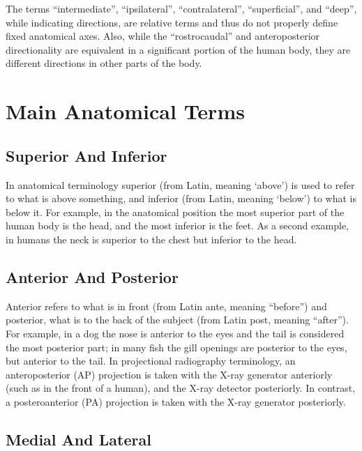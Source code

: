 The terms ``intermediate'', ``ipsilateral'', ``contralateral'', ``superficial'', and ``deep'', while indicating directions, are relative terms and thus do not properly define fixed anatomical axes. Also, while the ``rostrocaudal'' and anteroposterior directionality are equivalent in a significant portion of the human body, they are different directions in other parts of the body.

\hypertarget{main-anatomical-terms}{%
\section{Main Anatomical Terms}\label{main-anatomical-terms}}

\hypertarget{superior-and-inferior}{%
\subsection{Superior And Inferior}\label{superior-and-inferior}}

In anatomical terminology superior (from Latin, meaning `above') is used to refer to what is above something, and inferior (from Latin, meaning `below') to what is below it. For example, in the anatomical position the most superior part of the human body is the head, and the most inferior is the feet. As a second example, in humans the neck is superior to the chest but inferior to the head.

\hypertarget{anterior-and-posterior}{%
\subsection{Anterior And Posterior}\label{anterior-and-posterior}}

Anterior refers to what is in front (from Latin ante, meaning ``before'') and posterior, what is to the back of the subject (from Latin post, meaning ``after''). For example, in a dog the nose is anterior to the eyes and the tail is considered the most posterior part; in many fish the gill openings are posterior to the eyes, but anterior to the tail. In projectional radiography terminology, an anteroposterior (AP) projection is taken with the X-ray generator anteriorly (such as in the front of a human), and the X-ray detector posteriorly. In contrast, a posteroanterior (PA) projection is taken with the X-ray generator posteriorly.

\hypertarget{medial-and-lateral}{%
\subsection{Medial And Lateral}\label{medial-and-lateral}}

